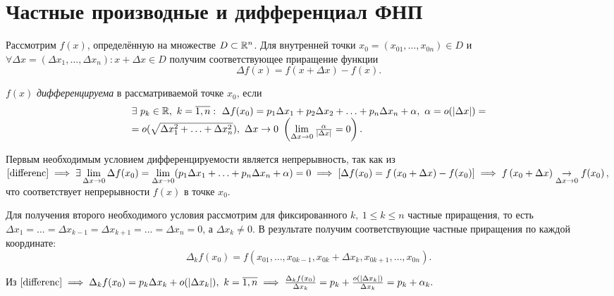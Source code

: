 \documentclass[../../main.tex]{subfiles}
\begin{document}
	\section{Частные производные и дифференциал ФНП}
	
	Рассмотрим $f(x)$, определённую на множестве $D \subset \mathbb{R}^n$. Для
	внутренней точки $x_0 = (x_{01}, \ldots, x_{0n}) \in D$ и $\forall 
	\Delta x = (\Delta x_1, \ldots, \Delta x_n): x + \Delta x \in D$ получим
	соответствующее приращение функции 
	\begin{equation}
		\label{increment}
		\Delta f(x) = f\left(x + \Delta x\right) - f(x).
	\end{equation}
	\begin{defn}
		$f(x)$ \emph{дифференцируема} в рассматриваемой точке $x_0$, если
		\begin{equation}
			\label{differenc}
			\begin{array}{l}
			\exists \ p_k \in \R, \ k = \overline{1,n}:\ \Delta f(x_0)= p_1 
			\Delta x_1 + p_2 \Delta x_2 + \ldots + p_n \Delta x_n + \alpha,\ 
    		\alpha = o(|\Delta x|) = \\ =o(\sqrt{\Delta x_1^2 + \ldots + \Delta
    		x_n^2}),\ \Delta x \to 0 \ \left(\lim\limits_{\Delta x \to 0} 
    		\frac{\alpha}{|\Delta x|} = 0\right).
    	    \end{array}
		\end{equation}
	\end{defn}
	
	Первым необходимым условием дифференцируемости является непрерывность, так
	как из $\eqref{differenc} \implies \exists \lim\limits_{\Delta x \to 0}
	\Delta f(x_0) = \lim\limits_{\Delta x \to 0} (p_1 \Delta x_1 + \ldots + 
	p_n \Delta x_n + \alpha) = 0 \implies [\Delta f(x_0) = f\left(x_0 + 
	\Delta x\right) - f(x_0)] \implies 
	f\left(x_0 + \Delta x\right) \underset{\Delta x \to 0}{\to} f(x_0)$, что 
	соответствует  непрерывности $f(x)$ в точке $x_0$.
	
	Для получения второго необходимого условия рассмотрим для фиксированного 
	$k, \ 1 \leq k \leq n$ частные приращения, то есть $\Delta x_1 = \ldots = 
	\Delta x_{k-1} = \Delta x_{k + 1} = \ldots = \Delta x_n = 0$, а $\Delta x_k
	\ne 0$. В результате получим соответствующие частные приращения по каждой 
	координате:
	\[\Delta_k f(x_0) = f(x_{01}, \ldots, x_{0k-1}, x_{0k} + 
	\Delta x_k, x_{0k+1}, \ldots, x_{0n}).\]
	
	Из $\eqref{differenc} \implies
	\Delta_k f(x_0) = p_k \Delta x_k + o(|\Delta x_k|),\ k = \overline{1, n}
	\implies \frac{\Delta_k f(x_0)}{\Delta x_k} = p_k + 
	\frac{o(|\Delta x_k|)}{\Delta x_k} = p_k + \alpha_k.$
	
\end{document}
